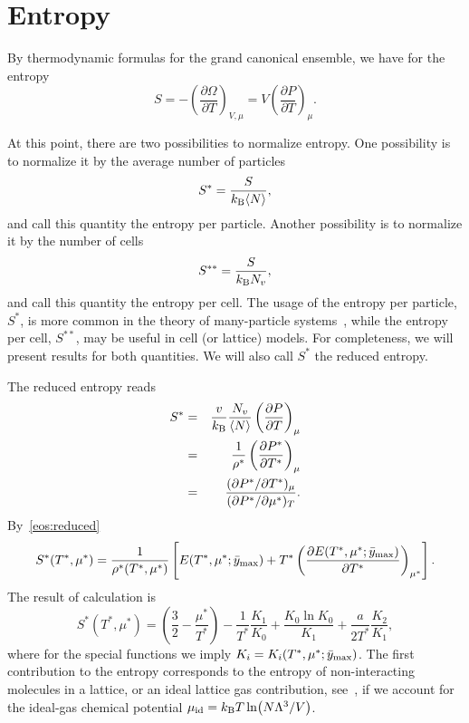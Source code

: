 \documentclass[12pt]{article}
\numberwithin{equation}{section}
\begin{document}
	\pagebreak
	\section{Entropy}
	By thermodynamic formulas for the grand canonical ensemble, we have for the entropy
	\begin{equation}
		S = -\left(\frac{\partial \Omega}{\partial T}\right)_{V,\mu} = V\left(\frac{\partial P}{\partial T}\right)_{\mu}.
	\end{equation} 
	
	At this point, there are two possibilities to normalize entropy. One possibility is to normalize it by the average number of particles
	\begin{equation}
		S^{*} = \frac{S}{k_{\rm B} \langle N \rangle},
	\end{equation}
	and call this quantity the entropy per particle. Another possibility is to normalize it by the number of cells
	\begin{equation}
		S^{**} = \frac{S}{k_{\rm B}N_v},
	\end{equation}
	and call this quantity the entropy per cell. The usage of the entropy per particle, $S^*$, is more common in the theory of many-particle systems~\cite{HansenMcDonald13}, while the entropy per cell, $S^{**}$, may be useful in cell (or lattice) models. For completeness, we will present results for both quantities. We will also call $S^*$ the reduced entropy.
	
	
	The reduced entropy reads
	\begin{eqnarray}
		S^* & = & \frac{v}{k_{\rm B}} \frac{N_v}{\langle N \rangle} \left(\frac{\partial P}{\partial T}\right)_{\mu}
		\\
		& = & \frac{1}{\rho^*}\left(\frac{\partial P^*}{\partial T^*}\right)_{\mu}
		\\
		& = & \frac{(\partial P^* / \partial T^*)_{\mu}}{(\partial P^* / \partial \mu^*)_T}.
	\end{eqnarray}
	By~\eqref{eos:reduced}
	\begin{equation}
		\label{eq:entropy}
		S^*(T^*,\mu^*) = \frac{1}{\rho^*(T^*,\mu^*)} 
		\left[ 
		E(T^*,\mu^*;\bar{y}_{\rm max}) + T^* \left(\frac{\partial E(T^*,\mu^*;\bar{y}_{\rm max})}{\partial T^*}\right)_{\mu^*} 
		\right].
	\end{equation}
	The result of calculation is
	\begin{equation}
		\label{S_vs_T_mu}
		S^*(T^*,\mu^*) = \left(\frac{3}{2} - \frac{\mu^*}{T^*}\right) - \frac{1}{T^*}\frac{K_1}{K_0} + \frac{K_0 \ln K_0}{K_1} + \frac{a}{2T^*} \frac{K_2}{K_1},
	\end{equation}
	where for the special functions we imply $K_i = K_i(T^*,\mu^*;\bar{y}_{\rm max})$.
	The first contribution to the entropy corresponds to the entropy of non-interacting molecules in a lattice, or an ideal lattice gas contribution, see~\cite[(47.4)]{Hill56}, if we account for the ideal-gas chemical potential $\mu_{\rm id} = k_{\rm B}T \ln(N\Lambda^3/V)$. 
	
\end{document}
